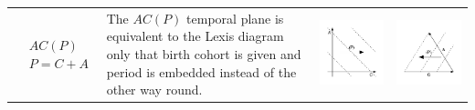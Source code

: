 \documentclass[
  12pt
]{scrartcl}
\begin{document}
\begin{center}
\begin{longtable}{m{}m{}m{}m{}}
$$\begin{aligned}
    &AC(P) \\
    &P = C + A
  \end{aligned}$$ &
  The $AC(P)$ temporal plane is equivalent to the Lexis diagram only that birth cohort is given and period is embedded instead of the other way round. &
  \includegraphics[width = \linewidth]{../fig/ACp.pdf} &
  \includegraphics[width = \linewidth]{../fig/ACp_iso.pdf}  \\

\end{longtable}
\end{center}
\end{document}
